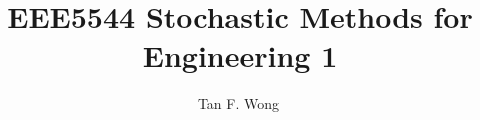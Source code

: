 \documentclass[utf8]{FrontiersinHarvard} %
\def\firstAuthorLast{Tan F. Wong} %
\def\Authors{Tan F. Wong\,$^{}$}
\begin{document}
\onecolumn
{}

\title[]{EEE5544 Stochastic Methods for Engineering 1}

\author[\firstAuthorLast ]{\Authors} %
\address{} %
\correspondance{} %

\extraAuth{}

\maketitle









% 



\end{document}
